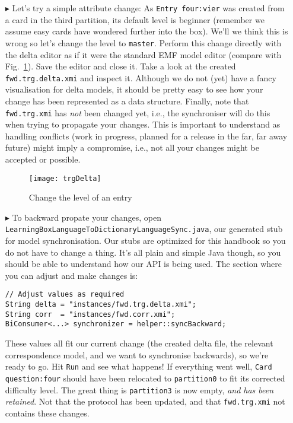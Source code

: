 \begin{itemize}
\item[$\blacktriangleright$] Let's try a simple attribute change:  As \texttt{Entry four:vier} was created from a card in the third partition, its default level is beginner (remember we assume easy cards have wondered further into the box).
We'll we think this is wrong so let's change the level to \texttt{master}.
Perform this change directly with the delta editor as if it were the standard EMF model editor (compare with Fig.~\ref{fig:trgDelta}).
Save the editor and close it.
Take a look at the created \texttt{fwd.trg.delta.xmi} and inspect it.
Although we do not (yet) have a fancy visualisation for delta models, it should be pretty easy to see how your change has been represented as a data structure.
Finally, note that \texttt{fwd.trg.xmi} has \emph{not} been changed yet, i.e., the synchroniser will do this when trying to propagate your changes.
This is important to understand as handling conflicts (work in progress, planned for a release in the far, far away future) might imply a compromise, i.e., not all your changes might be accepted or possible.

\begin{figure}[htbp]
\begin{center}
  \texttt{[image: trgDelta]}
  \caption{Change the level of an entry}
  \label{fig:trgDelta}
\end{center}
\end{figure}

\item[$\blacktriangleright$] To backward propate your changes, open \texttt{Learning\-Box\-Language\-To\-Dictionary\-Language\-Sync.java}, our generated stub for model synchronisation.
Our stubs are optimized for this handbook so you do not have to change a thing.
It's all plain and simple Java though, so you should be able to understand how our API is being used.
The section where you can adjust and make changes is:
\begin{verbatim}
// Adjust values as required
String delta = "instances/fwd.trg.delta.xmi";
String corr  = "instances/fwd.corr.xmi";
BiConsumer<...> synchronizer = helper::syncBackward;
\end{verbatim}

These values all fit our current change (the created delta file, the relevant correspondence model, and we want to synchronise backwards), so we're ready to go.
Hit \texttt{Run} and see what happens!
If everything went well, \texttt{Card question:four} should have been relocated to \texttt{partition0} to fit its corrected difficulty level.
The great thing is \texttt{partition3} is now empty, \emph{and has been retained}.
Not that the protocol has been updated, and that \texttt{fwd.trg.xmi} not contains these changes.
\end{itemize}

